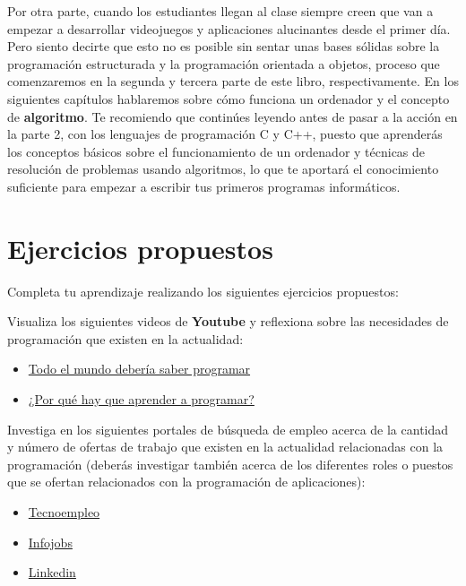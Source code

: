 Por otra parte, cuando los estudiantes llegan al clase siempre creen que van a empezar a desarrollar videojuegos y aplicaciones
alucinantes desde el primer día. Pero siento decirte que esto no es posible sin sentar unas bases sólidas sobre la programación
estructurada y la programación orientada a objetos, proceso que comenzaremos en la segunda y tercera parte de este libro, 
respectivamente. En los siguientes capítulos hablaremos sobre cómo funciona un ordenador y el concepto de \textbf{algoritmo}. Te
recomiendo que continúes leyendo antes de pasar a la acción en la parte 2, con los lenguajes de programación C y C++, puesto
que aprenderás los conceptos básicos sobre el funcionamiento de un ordenador y técnicas de resolución de problemas usando
algoritmos, lo que te aportará el conocimiento suficiente para empezar a escribir tus primeros programas informáticos.

\section{Ejercicios propuestos}

Completa tu aprendizaje realizando los siguientes ejercicios propuestos:

\begin{exercise}
Visualiza los siguientes videos de \textbf{Youtube} y reflexiona sobre las necesidades de programación que existen en la actualidad:

\begin{itemize}
 \item \href{https://www.youtube.com/watch?v=X5Wkp1gsNik}{Todo el mundo debería saber programar}
 \item \href{https://www.youtube.com/watch?v=wldGsJTPJ1o}{¿Por qué hay que aprender a programar?}
\end{itemize}
\end{exercise}

\begin{exercise}
Investiga en los siguientes portales de búsqueda de empleo acerca de la cantidad y número de ofertas de trabajo que existen
en la actualidad relacionadas con la programación (deberás investigar también acerca de los diferentes roles o puestos
que se ofertan relacionados con la programación de aplicaciones):

\begin{itemize}
 \item \href{https://www.tecnoempleo.com/}{Tecnoempleo}
 \item \href{https://www.infojobs.net/}{Infojobs}
 \item \href{https://www.linkedin.com/}{Linkedin}
\end{itemize}
\end{exercise}
